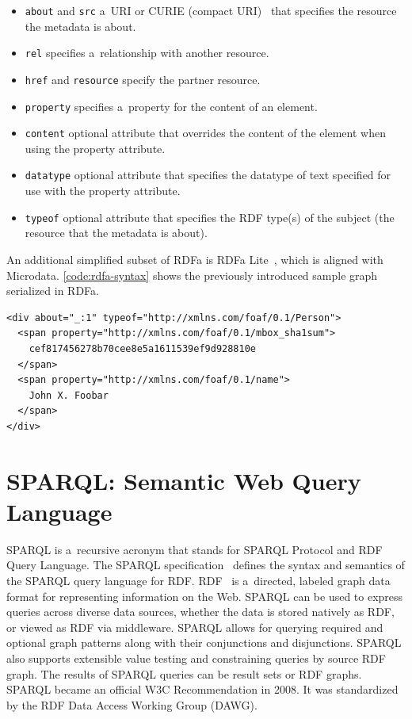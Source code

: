 \begin{itemize}
  \item \texttt{about} and \texttt{src} a~URI or
        CURIE (compact URI)~\cite{birbeck2007curie}
        that specifies the resource
        the metadata is about.
  \item \texttt{rel} specifies a~relationship with
        another resource.
  \item \texttt{href} and \texttt{resource} specify
        the partner resource.
  \item \texttt{property} specifies a~property for
        the content of an element.
  \item \texttt{content} optional attribute that overrides
        the content of the element when using
        the property attribute.
  \item \texttt{datatype} optional attribute that
        specifies the datatype of text specified
        for use with the property attribute.
  \item \texttt{typeof} optional attribute that specifies
        the RDF type(s) of the subject (the resource
        that the metadata is about).
\end{itemize}

An additional simplified subset of RDFa is RDFa Lite~\cite{sporny2012rdfaalite}, which is aligned with Microdata.
\autoref{code:rdfa-syntax} shows the previously introduced
sample graph serialized in RDFa.

\begin{lstlisting}[caption={Sample graph in RDFa syntax},
  label={code:rdfa-syntax}]
<div about="_:1" typeof="http://xmlns.com/foaf/0.1/Person">
  <span property="http://xmlns.com/foaf/0.1/mbox_sha1sum">
    cef817456278b70cee8e5a1611539ef9d928810e
  </span>
  <span property="http://xmlns.com/foaf/0.1/name">
    John X. Foobar
  </span>
</div>
\end{lstlisting}

\section{SPARQL: Semantic Web Query Language}

SPARQL is a~recursive acronym that stands for
SPARQL Protocol and RDF Query Language.
The SPARQL specification~\cite{prudhommeaux2008sparql}
defines the syntax and semantics
of the SPARQL query language for RDF.
RDF~\cite{klyne2004rdf} is a~directed, labeled
graph data format for representing information on the Web.
SPARQL can be used to express queries
across diverse data sources,
whether the data is stored natively as RDF,
or viewed as RDF via middleware.
SPARQL allows for querying required
and optional graph patterns
along with their conjunctions and disjunctions.
SPARQL also supports extensible value testing
and constraining queries by source RDF graph.
The results of SPARQL queries can be result sets or RDF graphs.
SPARQL became an official W3C Recommendation in 2008.
It was standardized by the RDF Data Access Working Group (DAWG).

